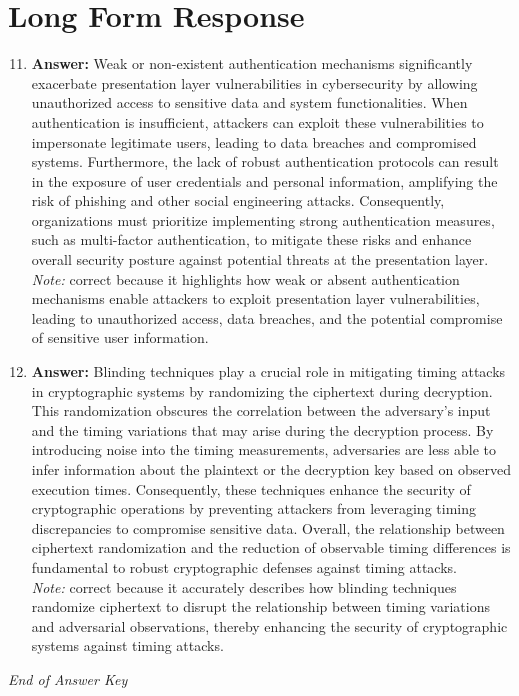 \documentclass[12pt]{article}
\begin{document}
\section*{Long Form Response}
\begin{enumerate}[label=\arabic*.]
\setcounter{enumi}{10}
\item \textbf{Answer:} Weak or non-existent authentication mechanisms significantly exacerbate presentation layer vulnerabilities in cybersecurity by allowing unauthorized access to sensitive data and system functionalities. When authentication is insufficient, attackers can exploit these vulnerabilities to impersonate legitimate users, leading to data breaches and compromised systems. Furthermore, the lack of robust authentication protocols can result in the exposure of user credentials and personal information, amplifying the risk of phishing and other social engineering attacks. Consequently, organizations must prioritize implementing strong authentication measures, such as multi-factor authentication, to mitigate these risks and enhance overall security posture against potential threats at the presentation layer.
\\ \textit{Note:} correct because it highlights how weak or absent authentication mechanisms enable attackers to exploit presentation layer vulnerabilities, leading to unauthorized access, data breaches, and the potential compromise of sensitive user information.
\item \textbf{Answer:} Blinding techniques play a crucial role in mitigating timing attacks in cryptographic systems by randomizing the ciphertext during decryption. This randomization obscures the correlation between the adversary's input and the timing variations that may arise during the decryption process. By introducing noise into the timing measurements, adversaries are less able to infer information about the plaintext or the decryption key based on observed execution times. Consequently, these techniques enhance the security of cryptographic operations by preventing attackers from leveraging timing discrepancies to compromise sensitive data. Overall, the relationship between ciphertext randomization and the reduction of observable timing differences is fundamental to robust cryptographic defenses against timing attacks.
\\ \textit{Note:} correct because it accurately describes how blinding techniques randomize ciphertext to disrupt the relationship between timing variations and adversarial observations, thereby enhancing the security of cryptographic systems against timing attacks.
\end{enumerate}

\vfill
\noindent\textit{End of Answer Key}
\end{document}
